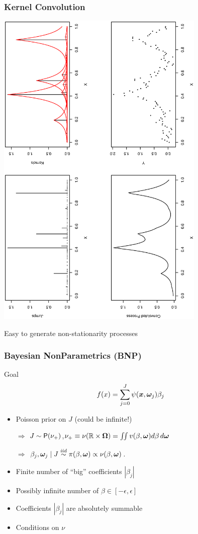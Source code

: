 \documentclass[]{beamer}\usepackage[]{graphicx}\usepackage[]{color}
\newcommand{\bs}[2]{\begin{frame} \frametitle{#1}
{#2}
\end{frame} }
\begin{document}
\bs{Kernel Convolution } {
    \includegraphics[angle=270,origin=l,totalheight=6truecm,
     clip=1, width=10cm]{gammaproc2.ps}

Easy to generate  non-stationarity processes

}







\bs{Bayesian NonParametrics (BNP)}{

Goal $$f(x) = \sum_{j=0}^{J}  \psi(\bm x, \bm \omega_j) \beta_j$$
\pause


\pause

\begin{itemize}
\item Poisson prior on $J$  (could be infinite!)
\item[$\Rightarrow$] $J \sim \mbox{\sf P}(\nu_+)$,\qquad $\nu_+\equiv
  \nu(\mathbb{R}\times\bm \Omega) = \iint v(\beta, \bm \omega) d \beta \,
  d\bm \omega$  \pause
\item[$\Rightarrow$] $\beta_j,\bm \omega_j \mid J \mathrel{\mathop{\sim}\limits^{\mathit{iid}}} \pi(\beta, \bm \omega)
  \propto \nu(\beta,\bm \omega)$. \pause
\end{itemize}

\begin{itemize}
  \item Finite number of ``big'' coefficients $|\beta_j|$ \pause
  \item Possibly infinite number of $\beta \in [-\epsilon, \epsilon]$ \pause
  \item Coefficients $|\beta_j|$ are absolutely summable \pause
  \item Conditions on $\nu$
 \end{itemize}




}
\end{document}
